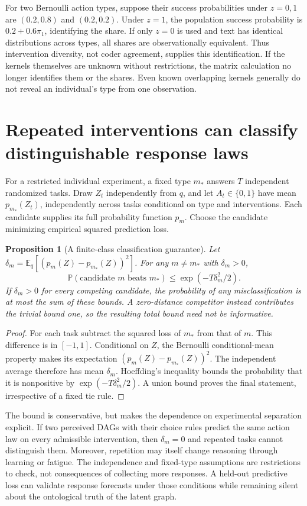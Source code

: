 \documentclass[11pt,a4paper]{article}
\newtheorem{proposition}[theorem]{Proposition}
\newcommand{\E}{\mathbb E}
\newcommand{\Prb}{\mathbb P}
\begin{document}
For two Bernoulli action types, suppose their success probabilities under $z=0,1$ are $(0.2,0.8)$ and $(0.2,0.2)$. Under $z=1$, the population success probability is $0.2+0.6\pi_1$, identifying the share. If only $z=0$ is used and text has identical distributions across types, all shares are observationally equivalent. Thus intervention diversity, not coder agreement, supplies this identification. If the kernels themselves are unknown without restrictions, the matrix calculation no longer identifies them or the shares. Even known overlapping kernels generally do not reveal an individual's type from one observation.

\section{Repeated interventions can classify distinguishable response laws}
For a restricted individual experiment, a fixed type $m_*$ answers $T$ independent randomized tasks. Draw $Z_t$ independently from $q$, and let $A_t\in\{0,1\}$ have mean $p_{m_*}(Z_t)$, independently across tasks conditional on type and interventions. Each candidate supplies its full probability function $p_m$. Choose the candidate minimizing empirical squared prediction loss.

\begin{proposition}[A finite-class classification guarantee]
Let $\delta_m=\E_q[(p_m(Z)-p_{m_*}(Z))^2]$. For any $m\ne m_*$ with $\delta_m>0$,
\[
 \Prb(\text{candidate }m\text{ beats }m_*)
 \le \exp(-T\delta_m^2/2).
\]
If $\delta_m>0$ for every competing candidate, the probability of any misclassification is at most the sum of these bounds. A zero-distance competitor instead contributes the trivial bound one, so the resulting total bound need not be informative.
\end{proposition}
\begin{proof}
For each task subtract the squared loss of $m_*$ from that of $m$. This difference is in $[-1,1]$. Conditional on $Z$, the Bernoulli conditional-mean property makes its expectation $(p_m(Z)-p_{m_*}(Z))^2$. The independent average therefore has mean $\delta_m$. Hoeffding's inequality bounds the probability that it is nonpositive by $\exp(-T\delta_m^2/2)$. A union bound proves the final statement, irrespective of a fixed tie rule.
\end{proof}

The bound is conservative, but makes the dependence on experimental separation explicit. If two perceived DAGs with their choice rules predict the same action law on every admissible intervention, then $\delta_m=0$ and repeated tasks cannot distinguish them. Moreover, repetition may itself change reasoning through learning or fatigue. The independence and fixed-type assumptions are restrictions to check, not consequences of collecting more responses. A held-out predictive loss can validate response forecasts under those conditions while remaining silent about the ontological truth of the latent graph.
\end{document}

